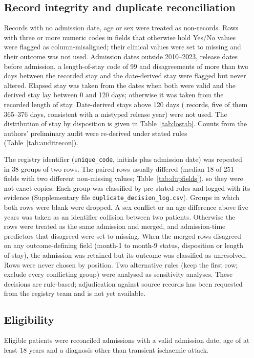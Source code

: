 \documentclass[preprint,10pt]{elsarticle}
\begin{document}
\subsection{Record integrity and duplicate reconciliation}
\label{sec:dups}
Records with no admission date, age or sex were treated as non-records. Rows with three or more numeric codes in fields that otherwise hold Yes/No values were flagged as column-misaligned; their clinical values were set to missing and their outcome was not used. Admission dates outside 2010--2023, release dates before admission, a length-of-stay code of 99 and disagreements of more than two days between the recorded stay and the date-derived stay were flagged but never altered. Elapsed stay was taken from the dates when both were valid and the derived stay lay between 0 and 120 days; otherwise it was taken from the recorded length of stay. Date-derived stays above 120 days (\Nstayimpl{} records, five of them 365--376 days, consistent with a mistyped release year) were not used. The distribution of stay by disposition is given in Table~\ref{tab:lostab}. Counts from the authors' preliminary audit were re-derived under stated rules (Table~\ref{tab:auditrecon}).

The registry identifier (\texttt{unique\_code}, initials plus admission date) was repeated in 38 groups of two rows. The paired rows usually differed (median 18 of 251 fields with two different non-missing values; Table~\ref{tab:dupfields}), so they were not exact copies. Each group was classified by pre-stated rules and logged with its evidence (Supplementary file \texttt{duplicate\_decision\_log.csv}). Groups in which both rows were blank were dropped. A sex conflict or an age difference above five years was taken as an identifier collision between two patients. Otherwise the rows were treated as the same admission and merged, and admission-time predictors that disagreed were set to missing. When the merged rows disagreed on any outcome-defining field (month-1 to month-9 status, disposition or length of stay), the admission was retained but its outcome was classified as unresolved. Rows were never chosen by position. Two alternative rules (keep the first row; exclude every conflicting group) were analysed as sensitivity analyses. These decisions are rule-based; adjudication against source records has been requested from the registry team and is not yet available.

\subsection{Eligibility}
Eligible patients were reconciled admissions with a valid admission date, age of at least 18 years and a diagnosis other than transient ischaemic attack.
\end{document}
